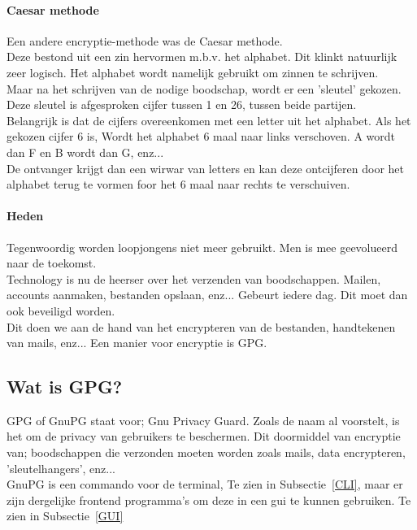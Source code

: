 \documentclass[12pt]{article}
\begin{document}
			\paragraph{Caesar methode}
				Een andere encryptie-methode was de Caesar methode.\\
				Deze bestond uit een zin hervormen m.b.v. het alphabet. Dit klinkt natuurlijk zeer 						logisch.
				Het alphabet wordt namelijk gebruikt om zinnen te schrijven.\\
				Maar na het schrijven van de nodige boodschap, wordt er een 'sleutel' gekozen. Deze 					sleutel is afgesproken cijfer tussen 1 en 26, tussen beide partijen.\\
				Belangrijk is dat de cijfers overeenkomen met een letter uit het alphabet. Als het 						gekozen cijfer 6 is, Wordt het alphabet 6 maal naar links verschoven. A wordt dan F 					en B wordt dan G, enz...\\
				De ontvanger krijgt dan een wirwar van letters en kan deze ontcijferen door het 						alphabet terug te vormen foor het 6 maal naar rechts te verschuiven.\\

			\newpage
			\paragraph{Heden}
				Tegenwoordig worden loopjongens niet meer gebruikt. Men is mee geevolueerd naar de 						toekomst.\\
				Technology is nu de heerser over het verzenden van boodschappen.
				Mailen, accounts aanmaken, bestanden opslaan, enz... Gebeurt iedere dag. Dit moet dan 					ook beveiligd worden.\\
				Dit doen we aan de hand van het encrypteren van de bestanden, handtekenen van mails,
				enz...
				Een manier voor encryptie is GPG.

			\newpage
			\subsection{Wat is GPG?}
				GPG of GnuPG staat voor; Gnu Privacy Guard. Zoals de naam al voorstelt, is het om de 					privacy van gebruikers te beschermen. Dit doormiddel van encryptie van; boodschappen 					die verzonden moeten worden zoals mails, data encrypteren, 'sleutelhangers', enz... 					\\
				GnuPG is een commando voor de terminal, Te zien in Subsectie~\ref{CLI}, maar er zijn 					dergelijke frontend programma's om deze in een gui te kunnen gebruiken. Te zien in 						Subsectie~\ref{GUI}
\end{document}
